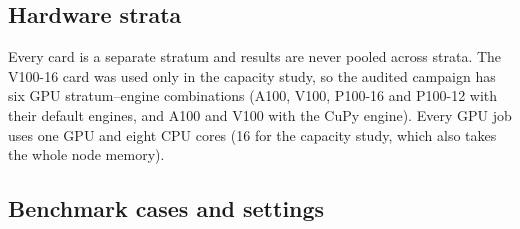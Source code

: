 \subsection{Hardware strata}

Every card is a separate stratum and results are never pooled across strata. The V100-16 card was used only in the capacity study, so the audited campaign has six GPU stratum--engine combinations (A100, V100, P100-16 and P100-12 with their default engines, and A100 and V100 with the CuPy engine). Every GPU job uses one GPU and eight CPU cores (16 for the capacity study, which also takes the whole node memory).

\begin{table}[!htbp]
\centering\small
{}
\caption{Hardware strata of the cluster. All GPU nodes ran driver 550.54.14 (CUDA 12.4). The P100 cards have no tensor cores. The measured cuBLAS double-precision matrix-multiply ceiling (an $8192^3$ product) is 16.3~TFLOPS on the A100 and 6.8~TFLOPS on the V100.}
\label{tab:hardware}
\end{table}

\subsection{Benchmark cases and settings}

